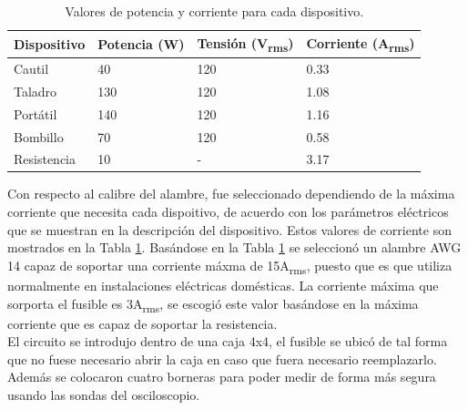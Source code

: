 \documentclass[journal]{IEEEtran}
\begin{document}

\begin{table}[h]
\centering
\begin{tabular}{|l|p{1.2cm}|p{1.5cm}|p{1.5cm}|}
\hline 
Dispositivo & Potencia (W) & Tensión (V\textsubscript{rms}) 
& Corriente (A\textsubscript{rms}) \\ \hline 
Cautil 	&  40	& 120 	& 0.33 \\ \hline 
Taladro 		& 130	& 120   & 1.08 \\ \hline 
Portátil 		& 140 	& 120   & 1.16 \\ \hline 
Bombillo		& 70  	& 120   & 0.58 \\ \hline 
Resistencia & 10 & - & 3.17 \\ \hline
\end{tabular}
\caption{Valores de potencia y corriente para cada dispositivo.}
\label{current_table}
\end{table}

Con respecto al calibre del alambre, fue seleccionado 
dependiendo de la máxima corriente que necesita cada 
dispoitivo, de acuerdo con los parámetros eléctricos 
que se muestran en la descripción del dispositivo. Estos
valores de corriente son mostrados en la Tabla
\ref{current_table}. Basándose en la 
Tabla \ref{current_table} se seleccionó un alambre 
AWG 14 capaz de soportar una corriente máxma de 
15A\textsubscript{rms}, puesto que es que utiliza 
normalmente en instalaciones eléctricas domésticas. 
La corriente máxima que sorporta el fusible es 
3A\textsubscript{rms}, se escogió este valor basándose
en la máxima corriente que es capaz de soportar la 
resistencia. \\

El circuito se introdujo dentro de una caja 4x4, el 
fusible se ubicó de tal forma que no fuese necesario 
abrir la caja en caso que fuera necesario reemplazarlo. 
Además se colocaron 
cuatro borneras para poder medir de forma más segura 
usando las sondas del osciloscopio. \\
\end{document}
